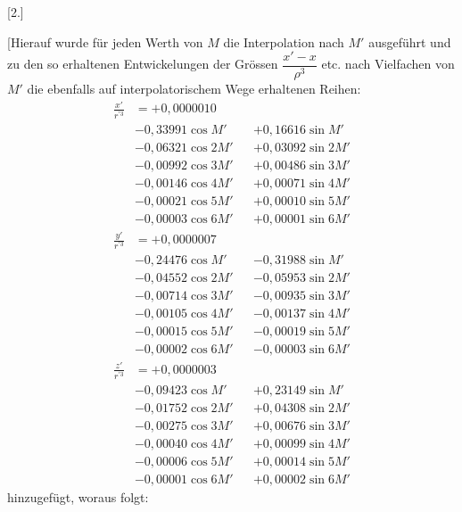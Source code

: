 \clearpage
\begingroup
{}
\renewcommand{\headrulewidth}{0pt}
\clearpage
{}
\begin{center}[2.]\end{center}
\begingroup
\small
\par\noindent\hspace*{\parindent}[Hierauf wurde für jeden Werth von \(M\) die Interpolation nach \(M'\) ausgeführt und zu den so
erhaltenen Entwickelungen der Grössen \(\dfrac{x'-x}{\rho^3}\) etc. nach Vielfachen von \(M'\) die
ebenfalls auf interpolatorischem Wege erhaltenen Reihen:
\[
\begin{aligned}
\frac{x'}{r^{\prime3}}&=+0{,}0000010&&\\
&-0{,}33991\cos M' && +0{,}16616\sin M'\\
&-0{,}06321\cos 2M' && +0{,}03092\sin 2M'\\
&-0{,}00992\cos 3M' && +0{,}00486\sin 3M'\\
&-0{,}00146\cos 4M' && +0{,}00071\sin 4M'\\
&-0{,}00021\cos 5M' && +0{,}00010\sin 5M'\\
&-0{,}00003\cos 6M' && +0{,}00001\sin 6M'
\end{aligned}
\]
\[
\begin{aligned}
\frac{y'}{r^{\prime3}}&=+0{,}0000007&&\\
&-0{,}24476\cos M' && -0{,}31988\sin M'\\
&-0{,}04552\cos 2M' && -0{,}05953\sin 2M'\\
&-0{,}00714\cos 3M' && -0{,}00935\sin 3M'\\
&-0{,}00105\cos 4M' && -0{,}00137\sin 4M'\\
&-0{,}00015\cos 5M' && -0{,}00019\sin 5M'\\
&-0{,}00002\cos 6M' && -0{,}00003\sin 6M'
\end{aligned}
\]
\[
\begin{aligned}
\frac{z'}{r^{\prime3}}&=+0{,}0000003&&\\
&-0{,}09423\cos M' && +0{,}23149\sin M'\\
&-0{,}01752\cos 2M' && +0{,}04308\sin 2M'\\
&-0{,}00275\cos 3M' && +0{,}00676\sin 3M'\\
&-0{,}00040\cos 4M' && +0{,}00099\sin 4M'\\
&-0{,}00006\cos 5M' && +0{,}00014\sin 5M'\\
&-0{,}00001\cos 6M' && +0{,}00002\sin 6M'
\end{aligned}
\]
hinzugefügt, woraus folgt:
\par
\endgroup

